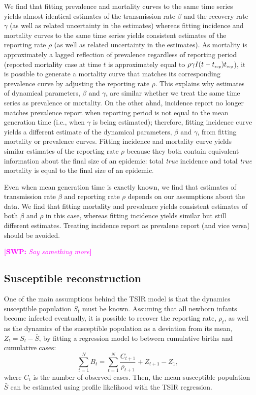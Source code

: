 \documentclass{article}
\newcommand{\comment}[3]{\textcolor{#1}{\textbf{[#2: }\textsl{#3}\textbf{]}}}
\newcommand{\swp}[1]{\comment{magenta}{SWP}{#1}}
\newcommand{\tsub}[2]{#1_{{\textrm{\tiny #2}}}}
\begin{document}
We find that fitting prevalence and mortality curves to the same time series yields almost identical estimates of the transmission rate $\beta$ and the recovery rate $\gamma$ (as well as related uncertainty in the estimates) whereas fitting incidence and mortality curves to the same time series yields consistent estimates of the reporting rate $\rho$  (as well as related uncertainty in the estimates).
As mortality is approximately a lagged reflection of prevalence regardless of reporting period (reported mortality case at time $t$ is approximately equal to $\rho \gamma I(t-\tsub{t}{rep}) \tsub{t}{rep}$), 
it is possible to generate a mortality curve that matches its corresponding prevalence curve by adjusting the reporting rate $\rho$.
This explains why estimates of dynamical parameters, $\beta$ and $\gamma$, are similar whether we treat the same time series as prevalence or mortality.
On the other ahnd, incidence report no longer matches prevalence report when reporting period is not equal to the mean generation time (i.e., when $\gamma$ is being estimated); therefore, fitting incidence curve yields a different estimate of the dynamical parameters, $\beta$ and $\gamma$, from fitting mortality or prevalence curves.
Fitting incidence and mortality curve yields similar estimates of the reporting rate $\rho$ because they both contain equivalent information about the final size of an epidemic: total \emph{true} incidence and total \emph{true} mortality is equal to the final size of an epidemic.

Even when mean generation time is exactly known, we find that estimates of transmission rate $\beta$ and reporting rate $\rho$ depends on our assumptions about the data.
We find that fitting mortality and prevalence yields consistent estimates of both $\beta$ and $\rho$ in this case, whereas fitting incidence yields similar but still different estimates.
Treating incidence report as prevalene report (and vice versa) should be avoided.

\swp{Say something more}

\subsection{Susceptible reconstruction}

One of the main assumptions behind the TSIR model is that the dynamics susceptible population $S_t$ must be known.
Assuming that all newborn infants become infected eventually, it is possible to recover the reporting rate, $\rho_t$, as well as the dynamics of the susceptible population as a deviation from its mean, $Z_t = S_t - \bar{S}$, by fitting a regression model to between cumulative births and cumulative cases: 
\begin{equation}
\sum_{t=1}^N B_t = \sum_{t=1}^N \frac{C_{t+1}}{\rho_{t+1}} + Z_{t+1} - Z_1,
\end{equation}
where $C_t$ is the number of observed cases. 
Then, the mean susceptible population $\bar S$ can be estimated using profile likelihood with the TSIR regression.
\end{document}
